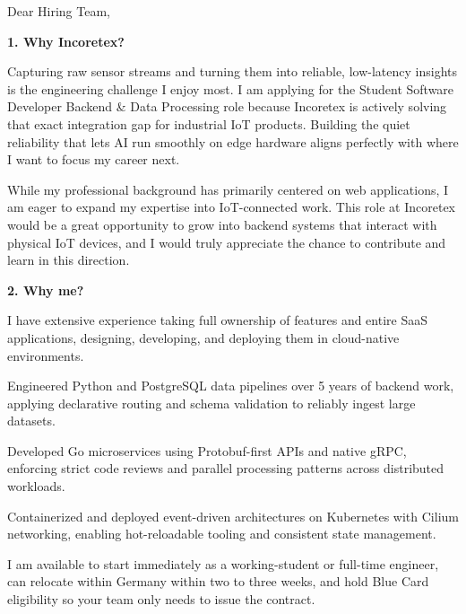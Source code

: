 \documentclass[11pt,a4paper]{coverletter}
\begin{document}

\opening{Dear Hiring Team,}

\vspace{8pt}\noindent\textbf{1. Why Incoretex?}\par\vspace{3pt}

Capturing raw sensor streams and turning them into reliable, low-latency insights is the engineering challenge I enjoy most. I am applying for the Student Software Developer Backend \& Data Processing role because Incoretex is actively solving that exact integration gap for industrial IoT products. Building the quiet reliability that lets AI run smoothly on edge hardware aligns perfectly with where I want to focus my career next.

While my professional background has primarily centered on web applications, I am eager to expand my expertise into IoT-connected work. This role at Incoretex would be a great opportunity to grow into backend systems that interact with physical IoT devices, and I would truly appreciate the chance to contribute and learn in this direction.

\vspace{8pt}\noindent\textbf{2. Why me?}\par\vspace{3pt}

I have extensive experience taking full ownership of features and entire SaaS applications, designing, developing, and deploying them in cloud-native environments.

\bullets

  \item Engineered Python and PostgreSQL data pipelines over 5 years of backend work, applying declarative routing and schema validation to reliably ingest large datasets.

  \item Developed Go microservices using Protobuf-first APIs and native gRPC, enforcing strict code reviews and parallel processing patterns across distributed workloads.

  \item Containerized and deployed event-driven architectures on Kubernetes with Cilium networking, enabling hot-reloadable tooling and consistent state management.

\bulletsend

I am available to start immediately as a working-student or full-time engineer, can relocate within Germany within two to three weeks, and hold Blue Card eligibility so your team only needs to issue the contract.
\end{document}
